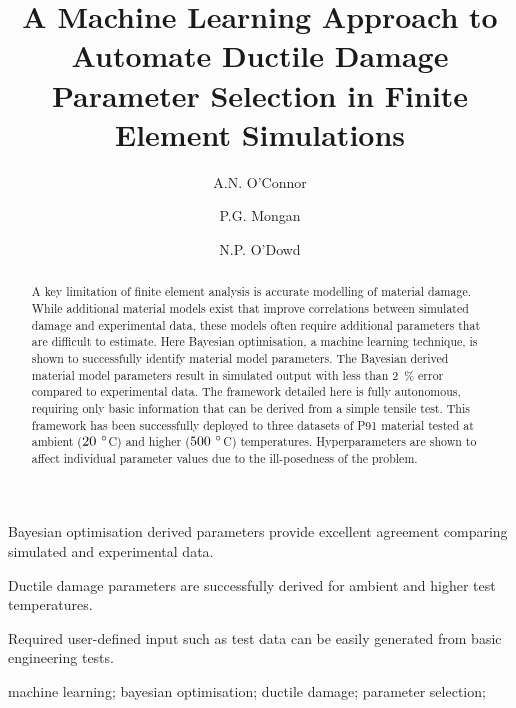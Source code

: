 \documentclass[preprint, review, 12pt]{elsarticle}
\begin{document}
	\begin{frontmatter}


		\title{A Machine Learning Approach to Automate Ductile Damage Parameter Selection in Finite Element Simulations}

		\author[1,2]{A.N. O'Connor}
		\author[1,3]{P.G. Mongan}
		\author[1,2,3]{N.P. O'Dowd}

		\address[1]{School of Engineering, University of Limerick, Ireland}
		\address[2]{Bernal Institute, University of Limerick, Ireland}
		\address[3]{Confirm Smart Manufacturing Research Centre, Ireland}

		\begin{abstract}
			A key limitation of finite element analysis is accurate modelling of material damage.
			While additional material models exist that improve correlations between simulated damage and experimental data, these models often require additional parameters that are difficult to estimate.
			Here Bayesian optimisation, a machine learning technique, is shown to successfully identify material model parameters.
			The Bayesian derived material model parameters result in simulated output with less than 2~\% error compared to experimental data.
			The framework detailed here is fully autonomous, requiring only basic information that can be derived from a simple tensile test.
			This framework has been successfully deployed to three datasets of P91 material tested at ambient ($20~\degree$C) and higher ($500~\degree$C) temperatures.
			Hyperparameters are shown to affect individual parameter values due to the ill-posedness of the problem.
		\end{abstract}

		\begin{highlights}
			\item Bayesian optimisation derived parameters provide excellent agreement comparing simulated and experimental data.
			\item Ductile damage parameters are successfully derived for ambient and higher test temperatures.
			\item Required user-defined input such as test data can be easily generated from basic engineering tests.
		\end{highlights}

		\begin{keyword}
			machine learning;
			bayesian optimisation;
			ductile damage;
			parameter selection;
		\end{keyword}

	\end{frontmatter}
\end{document}
